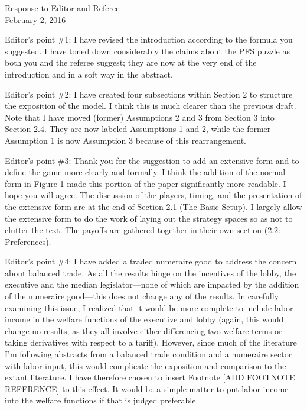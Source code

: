 \documentclass[12pt]{article}
\begin{document}
\begin{center}
\large Response to Editor and Referee \\
\normalsize February 2, 2016
\end{center}

Editor's point $\#$1: I have revised the introduction according to the formula you suggested. I have toned down considerably the claims about the PFS puzzle as both you and the referee suggest; they are now at the very end of the introduction and in a soft way in the abstract.

Editor's point $\#$2: I have created four subsections within Section 2 to structure the exposition of the model. I think this is much clearer than the previous draft. Note that I have moved (former) Assumptions 2 and 3 from Section 3 into Section 2.4. They are now labeled Assumptions 1 and 2, while the former Assumption 1 is now Assumption 3 because of this rearrangement.

Editor's point $\#$3: Thank you for the suggestion to add an extensive form and to define the game more clearly and formally. I think the addition of the normal form in Figure 1 made this portion of the paper significantly more readable. I hope you will agree. The discussion of the players, timing, and the presentation of the extensive form are at the end of Section 2.1 (The Basic Setup). I largely allow the extensive form to do the work of laying out the strategy spaces so as not to clutter the text. The payoffs are gathered together in their own section (2.2: Preferences).

Editor's point $\#$4: I have added a traded numeraire good to address the concern about balanced trade. As all the results hinge on the incentives of the lobby, the executive and the median legislator---none of which are impacted by the addition of the numeraire good---this does not change any of the results. In carefully examining this issue, I realized that it would be more complete to include labor income in the welfare functions of the executive and lobby (again, this would change no results, as they all involve either differencing two welfare terms or taking derivatives with respect to a tariff). However, since much of the literature I'm following abstracts from a balanced trade condition and a numeraire sector with labor input, this would complicate the exposition and comparison to the extant literature. I have therefore chosen to insert Footnote [{\color{blue}ADD FOOTNOTE REFERENCE}] to this effect. It would be a simple matter to put labor income into the welfare functions if that is judged preferable.
\end{document}
